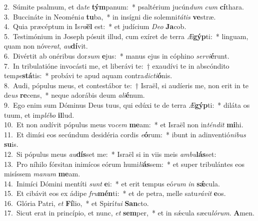 {2.~}Súmite psalmum, et da\textit{te} \textbf{tým}panum:~* psaltérium jucún\textit{dum} \textit{cum} \textbf{cí}thara.\\
{3.~}Buccináte in Neoméni\textit{a} \textbf{tu}ba,~* in insígni die solemni\textit{tá}\textit{tis} \textbf{ve}stræ.\\
{4.~}Quia præcéptum in Is\textit{ra}\textbf{ël} est:~* et judícium \textit{De}\textit{o} \textbf{Ja}cob.\\
{5.~}Testimónium in Joseph pósuit illud, cum exíret de terra \textit{Æ}\textbf{gýp}ti:~* linguam, quam non nóve\textit{rat}, \textit{au}\textbf{dí}vit.\\
{6.~}Divértit ab onéribus dor\textit{sum} \textbf{e}jus:~* manus ejus in cóphino \textit{ser}\textit{vi}\textbf{é}runt.\\
{7.~}In tribulatióne invocásti me, et liberávi te:~† exaudívi te in abscóndito tem\textit{pe}\textbf{stá}tis:~* probávi te apud aquam contra\textit{di}\textit{cti}\textbf{ó}nis.\\
{8.~}Audi, pópulus meus, et contestábor te:~† Israël, si audíeris me, non erit in te de\textit{us} \textbf{re}cens,~* neque adorábis deum \textit{a}\textit{li}\textbf{é}num.\\
{9.~}Ego enim sum Dóminus Deus tuus, qui edúxi te de terra \textit{Æ}\textbf{gýp}ti:~* diláta os tuum, et im\textit{plé}\textit{bo} \textbf{il}lud.\\
{10.~}Et non audívit pópulus meus vo\textit{cem} \textbf{me}am:~* et Israël non in\textit{tén}\textit{dit} \textbf{mi}hi.\\
{11.~}Et dimísi eos secúndum desidéria cordis \textit{e}\textbf{ó}rum:~* ibunt in adinventió\textit{ni}\textit{bus} \textbf{su}is.\\
{12.~}Si pópulus meus \textit{au}\textbf{dís}set me:~* Israël si in viis meis \textit{am}\textit{bu}\textbf{lás}set:\\
{13.~}Pro níhilo fórsitan inimícos eórum humi\textit{li}\textbf{ás}sem:~* et super tribulántes eos misíssem \textit{ma}\textit{num} \textbf{me}am.\\
{14.~}Inimíci Dómini mentíti \textit{sunt} \textbf{e}i:~* et erit tempus eó\textit{rum} \textit{in} \textbf{sǽ}cula.\\
{15.~}Et cibávit eos ex ádipe \textit{fru}\textbf{mén}ti:~* et de petra, melle satu\textit{rá}\textit{vit} \textbf{e}os.\\
{16.~}Glória Patri, \textit{et} \textbf{Fí}lio,~* et Spirí\textit{tu}\textit{i} \textbf{San}cto.\\
{17.~}Sicut erat in princípio, et nunc, \textit{et} \textbf{sem}per,~* et in sǽcula sæcu\textit{ló}\textit{rum}. \textbf{A}men.\\
